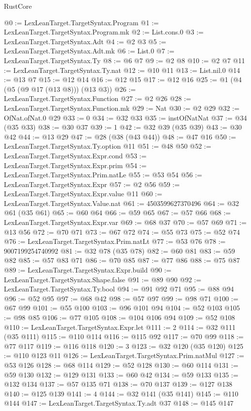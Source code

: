 \begin{lexlean}{RustCore}
\begin{coremodule}
@0 := LexLeanTarget.TargetSyntax.Program
@1 := LexLeanTarget.TargetSyntax.Program.mk
@2 := List.cons.{0}
@3 := LexLeanTarget.TargetSyntax.Adt
@4 := @2 @3
@5 := LexLeanTarget.TargetSyntax.Adt.mk
@6 := List.{0}
@7 := LexLeanTarget.TargetSyntax.Ty
@8 := @6 @7
@9 := @2 @8
@10 := @2 @7
@11 := LexLeanTarget.TargetSyntax.Ty.nat
@12 := @10 @11
@13 := List.nil.{0}
@14 := @13 @7
@15 := @12 @14
@16 := @12 @15
@17 := @12 @16
@25 := @1 (@4 (@5 (@9 @17 (@13 @8))) (@13 @3))
@26 := LexLeanTarget.TargetSyntax.Function
@27 := @2 @26
@28 := LexLeanTarget.TargetSyntax.Function.mk
@29 := Nat
@30 := @2 @29
@32 := OfNat.ofNat.{0} @29
@33 := 0
@34 := @32 @33
@35 := instOfNatNat
@37 := @34 (@35 @33)
@38 := @30 @37
@39 := 1
@42 := @32 @39 (@35 @39)
@43 := @30 @42
@44 := @13 @29
@47 := @28 (@38 (@43 @44))
@48 := @47 @16
@50 := LexLeanTarget.TargetSyntax.Ty.option @11
@51 := @48 @50
@52 := LexLeanTarget.TargetSyntax.Expr.cond
@53 := LexLeanTarget.TargetSyntax.Expr.prim
@54 := LexLeanTarget.TargetSyntax.Prim.natLe
@55 := @53 @54
@56 := LexLeanTarget.TargetSyntax.Expr
@57 := @2 @56
@59 := LexLeanTarget.TargetSyntax.Expr.value @11
@60 := LexLeanTarget.TargetSyntax.Value.nat
@61 := 4503599627370496
@64 := @32 @61 (@35 @61)
@65 := @60 @64
@66 := @59 @65
@67 := @57 @66
@68 := LexLeanTarget.TargetSyntax.Expr.var
@69 := @68 @37
@70 := @57 @69
@71 := @13 @56
@72 := @70 @71
@73 := @67 @72
@74 := @55 @73
@75 := @52 @74
@76 := LexLeanTarget.TargetSyntax.Prim.natLt
@77 := @53 @76
@78 := 9007199254740992
@81 := @32 @78 (@35 @78)
@82 := @60 @81
@83 := @59 @82
@85 := @57 @83 @71
@86 := @70 @85
@87 := @77 @86
@88 := @75 @87
@89 := LexLeanTarget.TargetSyntax.Expr.build
@90 := LexLeanTarget.TargetSyntax.Shape.false
@91 := @89 @90
@92 := LexLeanTarget.TargetSyntax.Ty.bool
@94 := @91 @92 @71
@95 := @88 @94
@96 := @52 @95
@97 := @68 @42
@98 := @57 @97
@99 := @98 @71
@100 := @67 @99
@101 := @55 @100
@103 := @96 @101 @94
@104 := @52 @103
@105 := @98 @85
@106 := @77 @105
@108 := @104 @106 @94
@109 := @52 @108
@110 := LexLeanTarget.TargetSyntax.Expr.let
@111 := 2
@114 := @32 @111 (@35 @111)
@115 := @110 @114
@116 := @115 @92
@117 := @70 @99
@118 := @77 @117
@119 := @116 @118
@120 := 3
@123 := @32 @120 (@35 @120)
@125 := @110 @123 @11
@126 := LexLeanTarget.TargetSyntax.Prim.natMul
@127 := @53 @126
@128 := @68 @114
@129 := @52 @128
@130 := @60 @114
@131 := @59 @130
@132 := @129 @131
@133 := @60 @42
@134 := @59 @133
@135 := @132 @134
@137 := @57 @135 @71
@138 := @70 @137
@139 := @127 @138
@140 := @125 @139
@141 := 4
@144 := @32 @141 (@35 @141)
@145 := @110 @144
@147 := LexLeanTarget.TargetSyntax.Ty.adt @37
@148 := @145 @147

\end{coremodule}
\end{lexlean}
